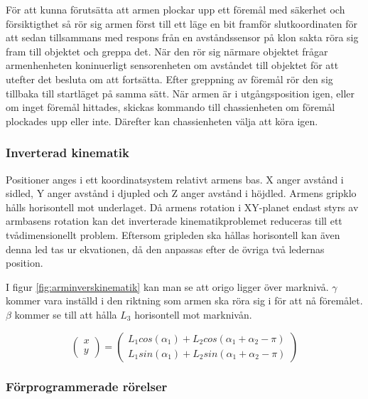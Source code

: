 För att kunna förutsätta att armen plockar upp ett föremål med säkerhet och försiktigthet så rör sig armen först till ett läge en bit framför slutkoordinaten för att sedan tillsammans med respons från en avståndssensor på klon sakta röra sig fram till objektet och greppa det. När den rör sig närmare objektet frågar armenhenheten koninuerligt sensorenheten om avståndet till objektet för att utefter det besluta om att fortsätta. Efter greppning av föremål rör den sig tillbaka till startläget på samma sätt. När armen är i utgångsposition igen, eller om inget föremål hittades, skickas kommando till chassienheten om föremål plockades upp eller inte. Därefter kan chassienheten välja att köra igen.


\subsubsection{Inverterad kinematik}

Positioner anges i ett koordinatsystem relativt armens bas. X anger avstånd i sidled, Y anger avstånd i djupled och Z anger avstånd i höjdled. Armens gripklo hålls horisontell mot underlaget. Då armens rotation i XY-planet endast styrs av armbasens rotation kan det inverterade kinematikproblemet reduceras till ett tvådimensionellt problem. Eftersom gripleden ska hållas horisontell kan även denna led tas ur ekvationen, då den anpassas efter de övriga två ledernas position.


I figur \ref{fig:arminverskinematik} kan man se att origo ligger över marknivå. $\gamma$ kommer vara inställd i den riktning som armen ska röra sig i för att nå föremålet. $\beta$ kommer se till att hålla $L_{3}$ horisontell mot marknivån.

$$
\begin{pmatrix}
	x \\
	y
\end{pmatrix}
 = 
\begin{pmatrix}
	L_{1}cos(\alpha_{1}) + L_{2}cos(\alpha_{1} + \alpha_{2} - \pi) \\
	L_{1}sin(\alpha_{1}) + L_{2}sin(\alpha_{1} + \alpha_{2} - \pi)
\end{pmatrix}$$



\subsubsection{Förprogrammerade rörelser}

